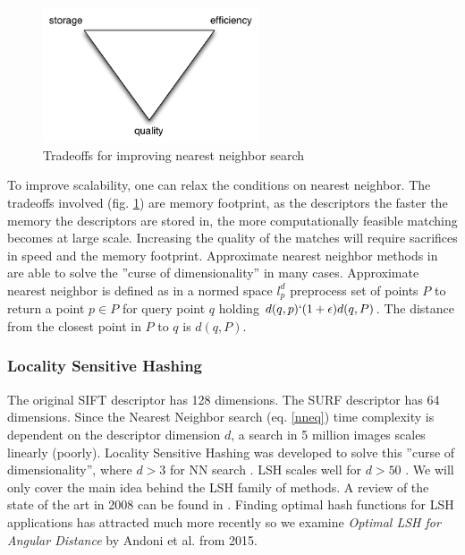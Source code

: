 \documentclass[english,12pt,a4paper,pdftex,elec,utf8, table]{aaltothesis}
\begin{document}
\begin{figure}[htb]
\begin{center}
\includegraphics[height=4cm]{figures/nntradeoffs}
\end{center}
\caption{Tradeoffs for improving nearest neighbor search}
\label{nntradeoffs}
\end{figure} To improve scalability, one can relax the conditions on nearest neighbor. The tradeoffs involved (fig. \ref{nntradeoffs}) are memory footprint, as the descriptors the faster the memory the descriptors are stored in, the more computationally feasible matching becomes at large scale. Increasing the quality of the matches will require sacrifices in speed and the memory footprint. Approximate nearest neighbor methods in \cite{Gionis1999} are able to solve the ''curse of dimensionality'' in many cases. Approximate nearest neighbor is defined as in a normed space $l_p^d$ preprocess set of points $P$ to return a point $p\in P$ for query point $q$ holding $d(q,p) \lq (1 + \epsilon)d(q,P)$. The distance from the closest point in $P$ to $q$ is $d(q, P)$.

\subsubsection{Locality Sensitive Hashing}
The original SIFT descriptor has 128 dimensions. The SURF descriptor has 64 dimensions. Since the Nearest Neighbor search (eq. \ref{nneq}) time complexity is dependent on the descriptor dimension $d$, a search in 5 million images scales linearly (poorly). Locality Sensitive Hashing was developed to solve this ''curse of dimensionality'', where $d > 3$ for NN search \cite{Gionis1999}. LSH scales well for $d > 50$ \cite{Gionis1999}. We will only cover the main idea behind the LSH family of methods. A review of the state of the art in 2008 can be found in \cite{Andoni2008}. Finding optimal hash functions for LSH applications has attracted much more recently so we examine \emph{Optimal LSH for Angular Distance} \cite{Andoni2015} by Andoni et al. from 2015.
\end{document}
